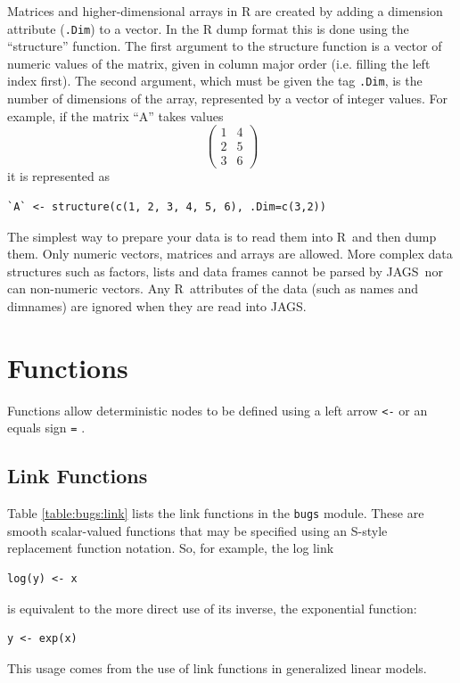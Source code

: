 \documentclass[11pt, a4paper, titlepage]{report}
\newcommand{\JAGS}{\textsf{JAGS}}
\newcommand{\R}{\textsf{R}}
\begin{document}
Matrices and higher-dimensional arrays in R are created by adding a
dimension attribute (\verb+.Dim+) to a vector. In the R dump format
this is done using the ``structure'' function.  The first argument to
the structure function is a vector of numeric values of the matrix,
given in column major order (i.e. filling the left index first). The
second argument, which must be given the tag \verb+.Dim+, is the
number of dimensions of the array, represented by a vector of integer
values. For example, if the matrix ``A'' takes values
\[
\left(
\begin{array}{cc}
  1 & 4 \\
  2 & 5 \\
  3 & 6 
\end{array}
\right)
\]
it is represented as
\begin{verbatim}
`A` <- structure(c(1, 2, 3, 4, 5, 6), .Dim=c(3,2))
\end{verbatim}

The simplest way to prepare your data is to read them into \R\ and
then dump them.  Only numeric vectors, matrices and arrays are
allowed. More complex data structures such as factors, lists and data
frames cannot be parsed by \JAGS\, nor can non-numeric vectors.  Any
\R\ attributes of the data (such as names and dimnames) are ignored
when they are read into \JAGS. 


\chapter{Functions}
\label{section:functions}

Functions allow deterministic nodes to be defined using a left arrow
\verb+<-+ or an equals sign \verb+=+ .

\section{Link Functions}

Table \ref{table:bugs:link} lists the link functions in the
\texttt{bugs} module.  These are smooth scalar-valued functions that
may be specified using an S-style replacement function notation. So,
for example, the log link
\begin{verbatim}
log(y) <- x
\end{verbatim}
is equivalent to the more direct use of its inverse, the exponential
function:
\begin{verbatim}
y <- exp(x)
\end{verbatim}
This usage comes from the use of link functions in generalized linear
models.
\end{document}
